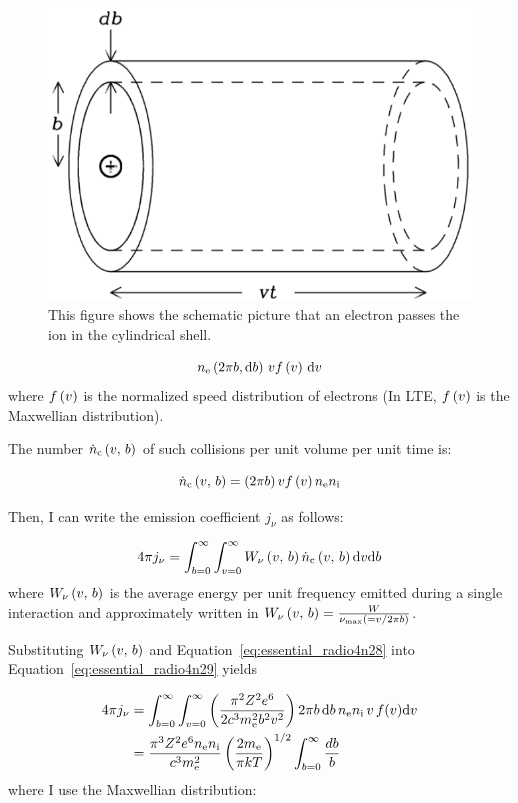 \begin{figure}[htbp]
	\centering
	\includegraphics[width=.6\linewidth]{Chapter_2/Figures/NRAO_radio4n5.png}
    \caption[The schematic picuture of the cylindrical shell of electrons]{\label{fig:nrao_radio4n5}
        This figure shows the schematic picture that an electron passes the ion in the cylindrical shell.
    }
\end{figure}

\begin{equation}\label{eq:essential_radio4n27}
    n_{\mathrm{e}} \left(2\pi b,\mathrm{d} b\right)\,v f\left(v\right)\,\mathrm{d} v
\end{equation}
where $f\left(v\right)$ is the normalized speed distribution of electrons (In LTE, $f\left(v\right)$ is the Maxwellian distribution).

The number $\dot{n}_{\mathrm{c}}\left(v,\,b\right)$ of such collisions per unit volume per unit time is:

\begin{equation}\label{eq:essential_radio4n28}
    \dot{n}_{\mathrm{c}}\left(v,\,b\right) = \left(2\pi b\right) v f\left(v\right) n_{\mathrm{e}} n_{\mathrm{i}}
\end{equation}

Then, I can write the emission coefficient $j_{\nu}$ as follows:

\begin{equation}\label{eq:essential_radio4n29}
    4 \pi j_{\nu}=\int_{b=0}^{\infty} \int_{v=0}^{\infty} W_{\nu}\left(v,\,b\right) \dot{n}_{\mathrm{c}}\left(v,\,b\right) \mathrm{d} v \mathrm{d} b
\end{equation}
where $W_{\mathrm{\nu}}\left(v,\,b\right)$ is the average energy per unit frequency emitted during a single interaction and approximately written in $W_{\mathrm{\nu}}\left(v,\,b\right) = \frac{W}{\nu_{\mathrm{\max}} \left(= v/2\pi b\right)}$.

Substituting $W_{\mathrm{\nu}}\left(v,\,b\right)$ and Equation~\ref{eq:essential_radio4n28} into Equation~\ref{eq:essential_radio4n29} yields

\begin{align}
    4 \pi j_{\nu} &= \int_{b=0}^{\infty} \int_{v=0}^{\infty} \left(\frac{\pi^2 Z^2 e^6}{2 c^3 m_{\mathrm{e}}^2 b^2 v^2}\right) 2 \pi b\,\mathrm{d} b\,n_{\mathrm{e}} n_{\mathrm{i}}\,v\,f(v) \mathrm{d} v \label{eq:essential_radio4n30}\\
                  &=\frac{\pi^{3} Z^{2} e^{6} n_{\mathrm{e}} n_{\mathrm{i}}}{c^{3} m_{\mathrm{e}}^{2}} \left(\frac{2m_{\mathrm{e}}}{\pi k T}\right)^{1/2}\int_{b=0}^{\infty} \frac{d b}{b}\label{eq:essential_radio4n31}
\end{align}
where I use the Maxwellian distribution:

